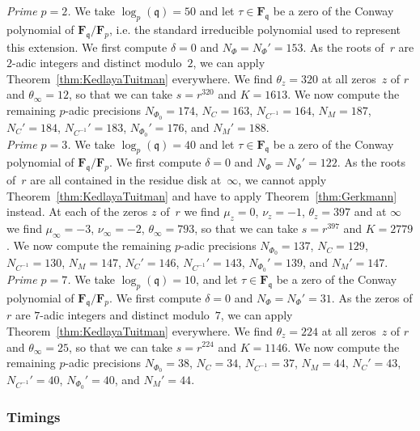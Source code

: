 \documentclass[a4paper,11pt]{article}
\numberwithin{equation}{section}
\newcommand{\FF}{\mathbf{F}} %
\theoremstyle{definition}
\begin{document}
\noindent
\textit{Prime $p=2$.} 
We take $\log_p(\mathfrak{q})=50$ and let $\tau \in \FF_{\mathfrak{q}}$ be 
a zero of the Conway polynomial of $\FF_{\mathfrak{q}}/\FF_p$, i.e. the 
standard irreducible polynomial used to represent this extension.  We first 
compute $\delta=0$ and $N_{\Phi}=N_{\Phi}'=153$.  As the roots of~$r$ are 
$2$-adic integers and distinct  modulo~$2$, we can apply 
Theorem~\ref{thm:KedlayaTuitman} everywhere. We find $\theta_z=320$ at all 
zeros~$z$ of $r$ and $\theta_{\infty}=12$, so that we can take $s=r^{320}$ 
and $K=1613$. We now compute the remaining $p$-adic precisions
$N_{\Phi_0}=174$, $N_C=163$, $N_{C^{-1}}=164$, $N_M=187$, 
$N_C'=184$, $N_{C^{-1}}'=183$, $N_{\Phi_0}'=176$, and $N_M'=188$. \\

\noindent 
\textit{Prime $p=3$.}
We take $\log_p(\mathfrak{q})=40$ and let $\tau \in \FF_{\mathfrak{q}}$ be 
a zero of the Conway polynomial of $\FF_{\mathfrak{q}}/\FF_p$.  We first 
compute $\delta=0$ and $N_{\Phi}=N_{\Phi}'=122$. As the roots of~$r$ are all 
contained in the residue disk at~$\infty$, we cannot apply 
Theorem~\ref{thm:KedlayaTuitman} and have to apply Theorem~\ref{thm:Gerkmann} 
instead. At each of the zeros $z$ of~$r$ we find $\mu_z=0$, $\nu_z=-1$, $\theta_z=397$ 
and at $\infty$ we find $\mu_{\infty}=-3$, $\nu_{\infty}=-2$, $\theta_{\infty}=793$, so that 
we can take $s=r^{397}$ and $K=2779$. We now compute the remaining $p$-adic 
precisions
$N_{\Phi_0}=137$, $N_C=129$, $N_{C^{-1}}=130$, $N_M=147$, 
$N_C'=146$, $N_{C^{-1}}'=143$, $N_{\Phi_0}'=139$, and $N_M'=147$. \\

\noindent
\textit{Prime $p=7$.}
We take $\log_p(\mathfrak{q})=10$, and let $\tau \in \FF_{\mathfrak{q}}$ be 
a zero of the Conway polynomial of $\FF_{\mathfrak{q}}/\FF_p$. We first 
compute $\delta=0$ and $N_{\Phi}=N_{\Phi}'=31$.  As the zeros of $r$ are 
$7$-adic integers and distinct modulo~$7$, we can apply 
Theorem~\ref{thm:KedlayaTuitman} everywhere.  We find $\theta_z=224$ at all 
zeros~$z$ of $r$ and $\theta_{\infty}=25$, so that we can take $s=r^{224}$ and
$K=1146$. We now compute the remaining $p$-adic precisions
$N_{\Phi_0}=38$, $N_C=34$, $N_{C^{-1}}=37$, $N_M=44$, 
$N_C'=43$, $N_{C^{-1}}'=40$, $N_{\Phi_0}'=40$, and $N_M'=44$.

\subsubsection{Timings}
\end{document}
